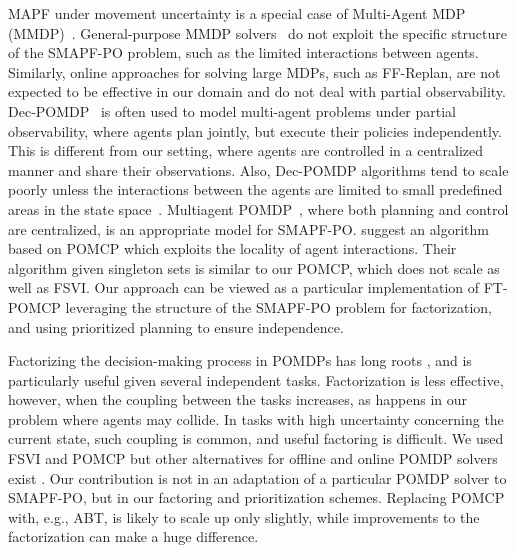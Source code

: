 \documentclass[letterpaper]{article} %
\begin{document}
MAPF under movement uncertainty is a special case of Multi-Agent MDP (MMDP)~\cite{boutilier1996planning}.
General-purpose MMDP solvers~\cite{de2021constrained} do not exploit the specific structure of the SMAPF-PO problem, such as the limited interactions between agents. Similarly, online approaches for solving large MDPs, such as FF-Replan\cite{yoon2007ff}, are not expected to be effective in our domain and do not deal with partial observability.
Dec-POMDP~\cite{oliehoek2012decentralized} is often used to model multi-agent problems under partial observability, where agents plan jointly, but execute their policies independently.
This is different from our setting, where agents are controlled in a centralized manner and share their observations.
Also, Dec-POMDP algorithms tend to scale poorly unless the interactions between the agents are limited to small predefined areas in the state space~\cite{melo2009learning}.
Multiagent POMDP~\cite{oliehoek2017madp}, where both planning and control are centralized, is an appropriate model for SMAPF-PO.  \citet{amato2015scalable} suggest an algorithm based on POMCP which exploits the locality of agent interactions.
Their algorithm given singleton sets is similar to our POMCP, which does not scale as well as FSVI.
Our approach can be viewed as a particular implementation of FT-POMCP leveraging the structure of the SMAPF-PO problem for factorization, and using prioritized planning to ensure independence.

Factorizing the decision-making process in POMDPs has long roots \cite[e.g.]{shani2008efficient,veiga2014point}, and is particularly useful given several independent tasks.
Factorization is less effective, however, when the coupling between the tasks increases, as happens in our problem where agents may collide. In tasks with high uncertainty concerning the current state, such coupling is common, and useful factoring is difficult.
We used FSVI and POMCP but other alternatives for offline and online POMDP solvers exist \cite[e.g.]{walraven2019point,kurniawati2016online,ye2017despot}. Our contribution  is not in an adaptation of a particular POMDP solver to SMAPF-PO, but in our factoring and prioritization schemes. Replacing POMCP with, e.g., ABT, is likely to scale up only slightly, while improvements to the factorization can make a huge difference.
\end{document}

